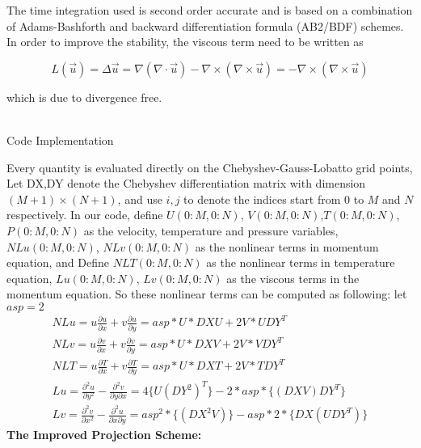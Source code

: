\documentclass[12pt]{article}
\begin{document}
The time integration used is second order accurate and is based on a combination 
of Adams-Bashforth and backward differentiation formula (AB2/BDF) schemes.\\
In order to improve the stability, the viscous term need to be written as

\begin{equation}
L(\vec{u})=\Delta \vec{u} = 
 \nabla(\nabla \cdot \vec{u})-\nabla \times (\nabla \times \vec{u})=
-\nabla \times (\nabla \times \vec{u})
\end{equation}

which is due to divergence free.\\
\\
\centerline{Code Implementation}
Every quantity is evaluated directly on the Chebyshev-Gauss-Lobatto grid points, 
Let DX,DY denote the Chebyshev differentiation matrix with dimension $(M+1) \times (N+1)$, 
and use $i,j$ to denote the indices start from 0 to $M$ and $N$ respectively. 
In our code, define $U(0:M,0:N)$, $V(0:M,0:N)$,$T(0:M,0:N)$, $P(0:M,0:N)$ 
as the velocity, 
temperature and pressure variables, $NLu(0:M,0:N)$, $NLv(0:M,0:N)$ as the nonlinear
terms in momentum equation,
and Define $NLT(0:M,0:N)$ as the nonlinear terms in temperature equation, 
$Lu(0:M,0:N)$, $Lv(0:M,0:N)$ as the viscous terms in the momentum equation. 
So these nonlinear terms can be computed as following:
let $asp = 2$
\begin{align}
NLu = u\frac{\partial u}{\partial x} + v\frac{\partial u}{\partial y}
=asp*U * DXU + 2V * UDY^{T}
\\
NLv = u\frac{\partial v}{\partial x} + v\frac{\partial v}{\partial y}
=asp*U*DXV + 2V*VDY^{T}
\\
NLT = u\frac{\partial T}{\partial x} + v\frac{\partial T}{\partial y}
=asp*U*DXT + 2V*TDY^{T}
\\
Lu  = \frac{\partial ^2u}{\partial y^{2}} - \frac{\partial ^2v}{\partial y\partial x}
=4\{U(DY^{2})^{T}\} - 2*asp*\{(DXV)DY^{T}\}
\\
Lv  = \frac{\partial ^2v}{\partial x^{2}} - \frac{\partial ^2u}{\partial x\partial y}
=asp^{2}*\{(DX^{2}V)\} - asp*2*\{DX(UDY^{T})\}
\end{align}
\textbf{The Improved Projection Scheme:}
\end{document}
